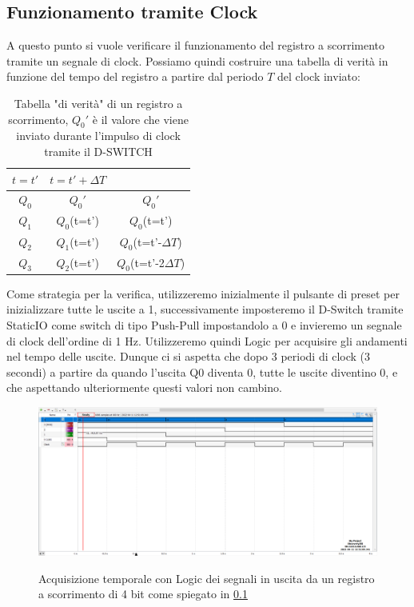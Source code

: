 \documentclass[10pt, a4paper, italian]{article}
\begin{document}
\subsection{Funzionamento tramite Clock}
\label{Clock_reg}
A questo punto si vuole verificare il funzionamento del registro a scorrimento tramite un segnale di clock.
Possiamo quindi costruire una tabella di verità in funzione del tempo del registro a partire dal periodo $T$ del clock inviato:
\begin{table}[htbp]
\centering
\begin{tabular}{c|cc}
\toprule
$t=t'$ & $t=t' + \Delta T$ & $ $\\
\midrule
\midrule
$Q_0$&$Q_0'$&$Q_0'$\\
$Q_1$&$Q_0$(t=t')&$Q_0$(t=t')\\
$Q_2$&$Q_1$(t=t')&$Q_0$(t=t'-$\Delta T$)\\
$Q_3$&$Q_2$(t=t')&$Q_0$(t=t'-2$\Delta T$)\\
\bottomrule
\end{tabular}
\caption{Tabella "di verità" di un registro a scorrimento, $Q_0'$ è il valore che viene inviato durante l'impulso di clock tramite il D-SWITCH
\label{tab: S-register}}
\end{table}
Come strategia per la verifica, utilizzeremo inizialmente il pulsante di preset per inizializzare tutte le uscite a 1, successivamente imposteremo il D-Switch tramite StaticIO come switch di tipo Push-Pull impostandolo a 0
e invieremo un segnale di clock dell'ordine di 1 Hz. Utilizzeremo quindi Logic per acquisire gli andamenti nel tempo delle uscite.
Dunque ci si aspetta che dopo 3 periodi di clock (3 secondi) a partire da quando l'uscita Q0 diventa 0, tutte le uscite diventino 0, e che aspettando ulteriormente questi valori non cambino.
\begin{figure}
	\includegraphics[width=\textwidth]{3.c}
	\label{fig: Shift_reg_clock}
	\caption{Acquisizione temporale con Logic dei segnali in uscita da un registro a scorrimento di 4 bit come spiegato in \cref{Clock_reg}}
\end{figure}
\end{document}
